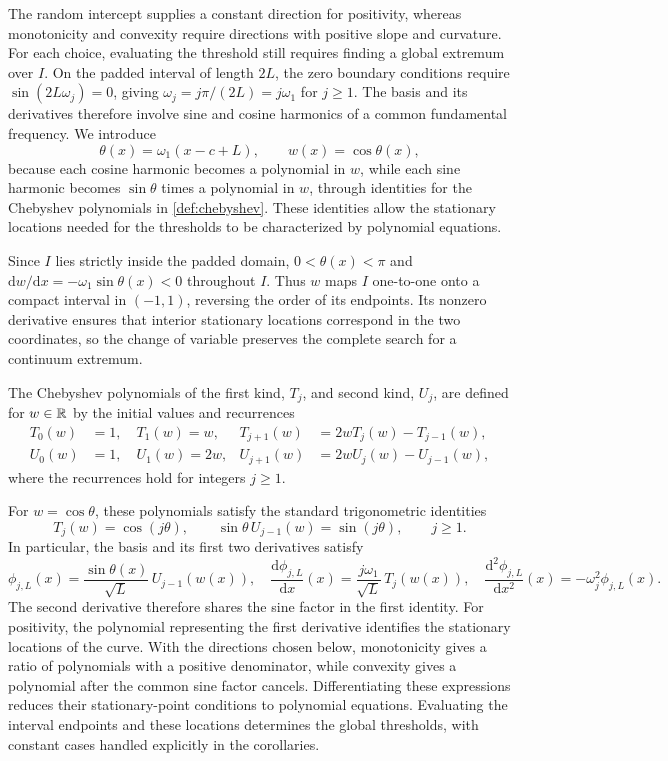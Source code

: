 The random intercept supplies a constant direction for positivity,
whereas monotonicity and convexity require directions with positive
slope and curvature. For each choice, evaluating the threshold still
requires finding a global extremum over $I$. On the padded interval of
length $2L$, the zero boundary conditions require
$\sin(2L\omega_j)=0$, giving
$\omega_j=j\pi/(2L)=j\omega_1$ for $j\geq1$. The basis and its
derivatives therefore involve sine and cosine harmonics of a common
fundamental frequency.
We introduce
\[
 \theta(x)=\omega_1(x-c+L),\qquad w(x)=\cos\theta(x),
\]
because each cosine harmonic becomes a polynomial in $w$, while each
sine harmonic becomes $\sin\theta$ times a polynomial in $w$, through
identities for the Chebyshev polynomials in \cref{def:chebyshev}.
These identities allow the stationary locations needed for the
thresholds to be characterized by polynomial equations.

Since $I$ lies strictly inside the padded domain, $0<\theta(x)<\pi$
and $\mathrm{d}w/\mathrm{d}x=-\omega_1\sin\theta(x)<0$ throughout $I$. Thus $w$ maps
$I$ one-to-one onto a compact interval in $(-1,1)$, reversing the order
of its endpoints. Its nonzero derivative ensures that interior
stationary locations correspond in the two coordinates, so the change
of variable preserves the complete search for a continuum extremum.

\begin{definition}\label{def:chebyshev}
The Chebyshev polynomials of the first kind, $T_j$, and second kind,
$U_j$, are defined for $w\in\mathbb R$ by the initial values and recurrences
\[
 \begin{aligned}
 T_0(w)&=1,\quad T_1(w)=w,
 & T_{j+1}(w)&=2wT_j(w)-T_{j-1}(w),\\
 U_0(w)&=1,\quad U_1(w)=2w,
 & U_{j+1}(w)&=2wU_j(w)-U_{j-1}(w),
 \end{aligned}
\]
where the recurrences hold for integers $j\geq1$.
\end{definition}

For $w=\cos\theta$, these polynomials satisfy the standard trigonometric
identities \citep[Equations (18.5.1) and (18.5.2)]{nist2026dlmf}
\[
 T_j(w)=\cos(j\theta),\qquad
 \sin\theta\,U_{j-1}(w)=\sin(j\theta),\qquad j\geq1.
\]
In particular, the basis and its first two derivatives satisfy
\[
 \phi_{j,L}(x)=\frac{\sin\theta(x)}{\sqrt L}\,U_{j-1}(w(x)),\quad
 \frac{\mathrm{d}\phi_{j,L}}{\mathrm{d}x}(x)=\frac{j\omega_1}{\sqrt L}\,T_j(w(x)),\quad
 \frac{\mathrm{d}^2\phi_{j,L}}{\mathrm{d}x^2}(x)=-\omega_j^2\phi_{j,L}(x).
\]
The second derivative therefore shares the sine factor in the first
identity. For positivity, the polynomial
representing the first derivative identifies the stationary locations
of the curve. With the directions chosen below, monotonicity gives a
ratio of polynomials with a positive denominator, while convexity gives
a polynomial after the common sine factor cancels. Differentiating
these expressions reduces their stationary-point conditions to
polynomial equations. Evaluating the interval
endpoints and these locations determines the global thresholds, with
constant cases handled explicitly in the corollaries.

